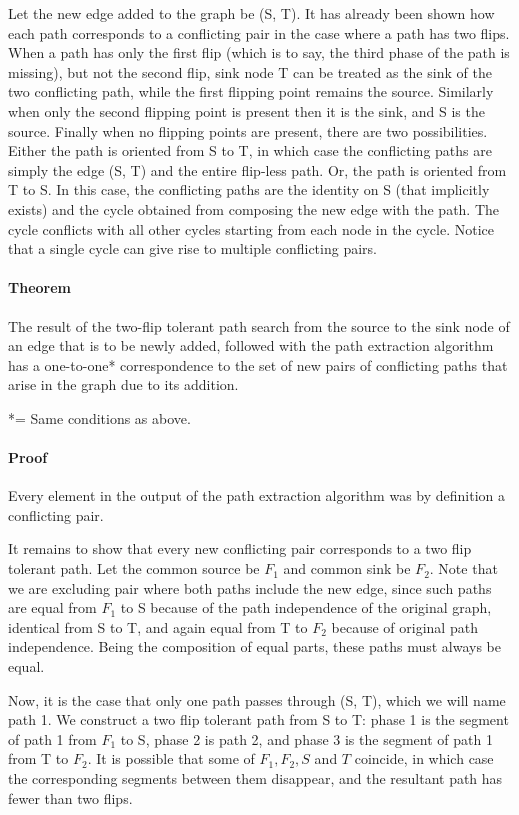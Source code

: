 \documentclass{article}
\begin{document}
Let the new edge added to the graph be (S, T).
It has already been shown how each path corresponds to a conflicting pair in the case where a path has two flips. When a path has only the first flip (which is to say, the third phase of the path is missing), but not the second flip, sink node T can be treated as the sink of the two conflicting path, while the first flipping point remains the source. Similarly when only the second flipping point is present then it is the sink, and S is the source. Finally when no flipping points are present, there are two possibilities. 
Either the path is oriented from S to T, in which case the conflicting paths are simply the edge (S, T) and the entire flip-less path.
Or, the path is oriented from T to S. In this case, the conflicting paths are the identity on S (that implicitly exists) and the cycle obtained from composing the new edge with the path. The cycle conflicts with all other cycles starting from each node in the cycle. Notice that a single cycle can give rise to multiple conflicting pairs.


\paragraph{Theorem} The result of the two-flip tolerant path search from the source to the sink node of an edge that is to be newly added, followed with the path extraction algorithm has a one-to-one* correspondence to the set of new pairs of conflicting paths that arise in the graph due to its addition.

*= Same conditions as above.

\paragraph{Proof}

Every element in the output of the path extraction algorithm was by definition a conflicting pair.

It remains to show that every new conflicting pair corresponds to a two flip tolerant path. Let the common source be $F_1$ and common sink be $F_2$. 
Note that we are excluding pair where both paths include the new edge, since such paths are equal from $F_1$ to S because of the path independence of the original graph, identical from S to T, and again equal from T to $F_2$ because of original path independence. Being the composition of equal parts, these paths must always be equal.

Now, it is the case that only one path passes through (S, T), which we will name path 1. We construct a two flip tolerant path from S to T: phase 1 is the segment of path 1 from $F_1$ to S, phase 2 is path 2, and phase 3 is the segment of path 1 from T to $F_2$. It is possible that some of $F_1, F_2, S$ and $T$ coincide, in which case the corresponding segments between them disappear, and the resultant path has fewer than two flips.
\end{document}
